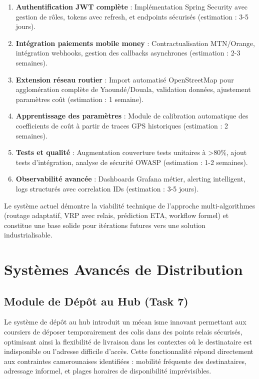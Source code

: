 \begin{enumerate}
    \item \textbf{Authentification JWT complète} : Implémentation Spring Security avec gestion de rôles, tokens avec refresh, et endpoints sécurisés (estimation : 3-5 jours).

    \item \textbf{Intégration paiements mobile money} : Contractualisation MTN/Orange, intégration webhooks, gestion des callbacks asynchrones (estimation : 2-3 semaines).

    \item \textbf{Extension réseau routier} : Import automatisé OpenStreetMap pour agglomération complète de Yaoundé/Douala, validation données, ajustement paramètres coût (estimation : 1 semaine).

    \item \textbf{Apprentissage des paramètres} : Module de calibration automatique des coefficients de coût à partir de traces GPS historiques (estimation : 2 semaines).

    \item \textbf{Tests et qualité} : Augmentation couverture tests unitaires à >80\%, ajout tests d'intégration, analyse de sécurité OWASP (estimation : 1-2 semaines).

    \item \textbf{Observabilité avancée} : Dashboards Grafana métier, alerting intelligent, logs structurés avec correlation IDs (estimation : 3-5 jours).
\end{enumerate}

Le système actuel démontre la viabilité technique de l'approche multi-algorithmes (routage adaptatif, VRP avec relais, prédiction ETA, workflow formel) et constitue une base solide pour itérations futures vers une solution industrialisable.

\section{Systèmes Avancés de Distribution}

\subsection{Module de Dépôt au Hub (Task 7)}

Le système de dépôt au hub introduit un mécan isme innovant permettant aux coursiers de déposer temporairement des colis dans des points relais sécurisés, optimisant ainsi la flexibilité de livraison dans les contextes où le destinataire est indisponible ou l'adresse difficile d'accès. Cette fonctionnalité répond directement aux contraintes camerounaises identifiées : mobilité fréquente des destinataires, adressage informel, et plages horaires de disponibilité imprévisibles.

